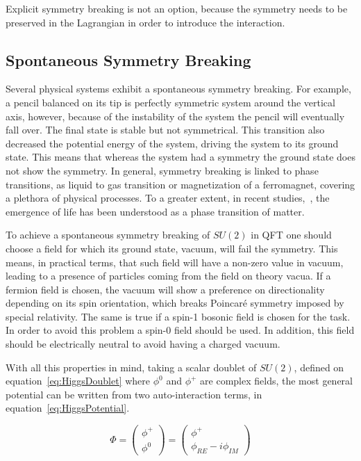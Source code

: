 Explicit symmetry breaking is not an option, because the symmetry needs to be preserved in the Lagrangian in order to introduce the interaction.

\subsection{Spontaneous Symmetry Breaking}
\label{sec:SSB}

Several physical systems exhibit a spontaneous symmetry breaking. For example, a pencil balanced on its tip is perfectly symmetric system around the vertical axis, however, because of the instability of the system the pencil will eventually fall over. The final state is stable but not symmetrical. This transition also decreased the potential energy of the system, driving the system to its ground state. This means that whereas the system had a symmetry the ground state does not show the symmetry. In general, symmetry breaking is linked to phase transitions, as liquid to gas transition or magnetization of a ferromagnet, covering a plethora of physical processes. To a greater extent, in recent studies,~\cite{2015arXiv150302776M}, the emergence of life has been understood as a phase transition of matter. 

To achieve a spontaneous symmetry breaking of $SU(2)$ in QFT one should choose a field for which its ground state, vacuum, will fail the symmetry. This means, in practical terms, that such field will have a non-zero value in vacuum, leading to a presence of particles coming from the field on theory vacua. If a fermion field is chosen, the vacuum will show a preference on directionality depending on its spin orientation, which breaks Poincar\'{e} symmetry imposed by special relativity. The same is true if a spin-1 bosonic field is chosen for the task. In order to avoid this problem a spin-0 field should be used. In addition, this field should be electrically neutral to avoid having a charged vacuum.

With all this properties in mind, taking a scalar doublet of $SU(2)$, defined on equation~\ref{eq:HiggsDoublet} where $\phi^{0}$ and $\phi^{+}$ are complex fields, the most general potential can be written from two auto-interaction terms, in equation~\ref{eq:HiggsPotential}.

\begin{equation}
  \label{eq:HiggsDoublet}
  \Phi=\left(
    \begin{array}{c}
      \phi^{+} \\
      \phi^{0}
    \end{array}
  \right)=\left(
    \begin{array}{c}
      \phi^{+} \\
      \phi_{RE}-i\phi_{IM}
    \end{array}
  \right)
\end{equation}

